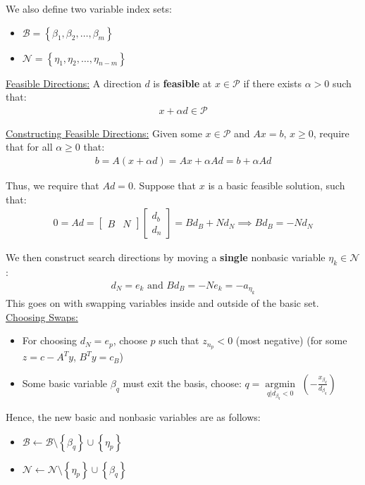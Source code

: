 \documentclass{article}
\newcommand{\sheader}[1]{\underline{#1:}}
\newcommand{\gap}{\medskip\\}
\newcommand{\curly}[1]{\left\{#1\right\}}
\newcommand{\ds}{\displaystyle}
\newcommand{\oper}[2]{\underset{#2}{\operatorname{#1}}}
\begin{document}
We also define two variable index sets:
\begin{itemize}
    \item $\mathcal{B} = \curly{\beta_1, \beta_2, \ldots, \beta_m}$
    \item $\mathcal{N} = \curly{\eta_1, \eta_2, \ldots, \eta_{n-m}}$
\end{itemize}

\sheader{Feasible Directions} A direction $d$ is \textbf{feasible} at 
$x \in \mathcal{P}$ if there exists $\alpha > 0$ such that:
\begin{align*}
    x + \alpha d \in \mathcal{P}
\end{align*}

\sheader{Constructing Feasible Directions} Given some $x \in \mathcal{P}$
and $Ax = b$, $x\geq 0$, require that for all $\alpha \geq 0$ that:
\begin{align*}
    b = A(x + \alpha d) = Ax + \alpha A d = b + \alpha Ad
\end{align*}

Thus, we require that $Ad = 0$. Suppose that $x$ is a basic feasible solution,
such that:
\begin{align*}
    0 = Ad = \begin{bmatrix}
        B & N
    \end{bmatrix} \begin{bmatrix}
        d_b \\ d_n
    \end{bmatrix}
    = Bd_B + Nd_N \implies Bd_B = -Nd_N
\end{align*}

We then construct search directions by moving a \textbf{single} nonbasic
variable $\eta_k \in \mathcal{N}$:
\begin{align*}
    d_N = e_k \textrm{  and  } Bd_B = -Ne_k = -a_{\eta_k}
\end{align*}
This goes on with swapping variables inside and outside of the basic set.
\gap
\sheader{Choosing Swaps}
\begin{itemize}
    \item For choosing $d_N = e_p$, choose $p$ such that $z_{n_p} < 0$ (most negative) (for some $z = c - A^Ty$, $B^Ty = c_B$)
    \item Some basic variable $\beta_q$ must exit the basis, choose: $\ds q = \oper{argmin}{q|d_{\beta_q} < 0} \,\,\left( -\frac{x_{\beta_q}}{d_{\beta_q}}\right)$
\end{itemize}
Hence, the new basic and nonbasic variables are as follows:
\begin{itemize}
    \item $\mathcal{B} \leftarrow \mathcal{B} \setminus \curly{\beta_q} \cup \curly{\eta_p}$
    \item $\mathcal{N} \leftarrow \mathcal{N} \setminus \curly{\eta_p} \cup \curly{\beta_q}$
\end{itemize}
\end{document}
